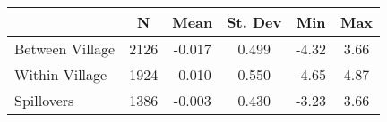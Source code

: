 \begin{tabular}{l*{5}{c}}\hline&\multicolumn{1}{c}{N}&\multicolumn{1}{c}{Mean}&\multicolumn{1}{c}{St. Dev}&\multicolumn{1}{c}{Min}&\multicolumn{1}{c}{Max}\\ \hline 
Between Village & 2126 & -0.017 & 0.499 & -4.32 & 3.66 \\
Within Village & 1924 & -0.010 & 0.550 & -4.65 & 4.87 \\
Spillovers & 1386 & -0.003 & 0.430 & -3.23 & 3.66 \\
\hline \end{tabular}
